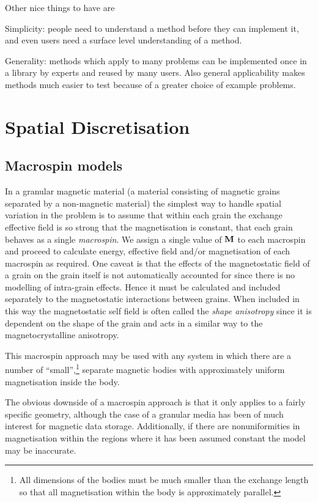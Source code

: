 Other nice things to have are 

Simplicity: people need to understand a method before they can implement it, and even users need a surface level understanding of a method.

Generality: methods which apply to many problems can be implemented once in a library by experts and reused by many users. 
Also general applicability makes methods much easier to test because of a greater choice of example problems.


\section{Spatial Discretisation}
\label{sec:spat-discr}

\subsection{Macrospin models}
\label{sec:sd-macrospins}

In a granular magnetic material (a material consisting of magnetic grains separated by a non-magnetic material) the simplest way to handle spatial variation in the problem is to assume that within each grain the exchange effective field is so strong that the magnetisation is constant, \ie that each grain behaves as a single \emph{macrospin}.
We assign a single value of $\mathbf{M}$ to each macrospin and proceed to calculate energy, effective field and/or magnetisation of each macrospin as required.
One caveat is that the effects of the magnetostatic field of a grain on the grain itself is not automatically accounted for since there is no modelling of intra-grain effects.
Hence it must be calculated and included separately to the magnetostatic interactions between grains.
When included in this way the magnetostatic self field is often called the \emph{shape anisotropy} since it is dependent on the shape of the grain and acts in a similar way to the magnetocrystalline anisotropy. 

This macrospin approach may be used with any system in which there are a number of ``small'',\footnote{All dimensions of the bodies must be much smaller than the exchange length so that all magnetisation within the body is approximately parallel.} separate magnetic bodies with approximately uniform magnetisation inside the body.

The obvious downside of a macrospin approach is that it only applies to a fairly specific geometry, although the case of a granular media has been of much interest for magnetic data storage. 
Additionally, if there are nonuniformities in magnetisation within the regions where it has been assumed constant the model may be inaccurate.

